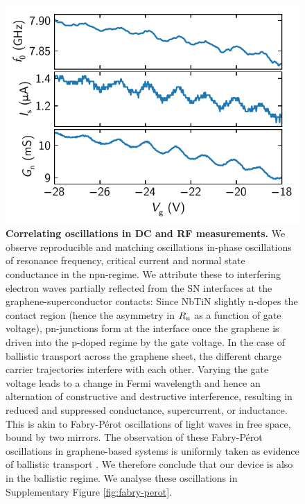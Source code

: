 \documentclass[preprint,
  onecolumn,
  notitlepage,
  amsmath,amssymb,
  aip,
  apl,
]{revtex4-1}
\begin{document}
\begin{figure}[]
    \centering
    \includegraphics[width=.6\linewidth]{figs/si_corr_osc}
    \caption{\textbf{Correlating oscillations in DC and RF measurements.}
        We observe reproducible and matching oscillations in-phase oscillations of resonance frequency, critical current and normal state conductance in the npn-regime.
        We attribute these to interfering electron waves partially reflected from the SN interfaces at the graphene-superconductor contacts:
        Since NbTiN slightly n-dopes the contact region (hence the asymmetry in $R_{\rm n}$ as a function of gate voltage), pn-junctions form at the interface once the graphene is driven into the p-doped regime by the gate voltage.
        In the case of ballistic transport across the graphene sheet, the different charge carrier trajectories interfere with each other.
        Varying the gate voltage leads to a change in Fermi wavelength and hence an alternation of constructive and destructive interference, resulting in reduced and suppressed conductance, supercurrent, or inductance.
        This is akin to Fabry-P\'erot oscillations of light waves in free space, bound by two mirrors.
        The observation of these Fabry-P\'erot oscillations in graphene-based systems is uniformly taken as evidence of ballistic transport \cite{liang_fabry_2001,miao_phasecoherent_2007,young_quantum_2009,cho_massless_2011,wu_quantum_2012,campos_quantum_2012,rickhaus_ballistic_2013,benshalom_quantum_2015,calado_ballistic_2015a,amet_supercurrent_2016a,borzenets_ballistic_2016a,allen_observation_2017,zhu_supercurrent_2018}.
        We therefore conclude that our device is also in the ballistic regime.
        We analyse these oscillations in Supplementary Figure \ref{fig:fabry-perot}.
    } 
    \label{fig:quantum_osc}
\end{figure}
\end{document}
